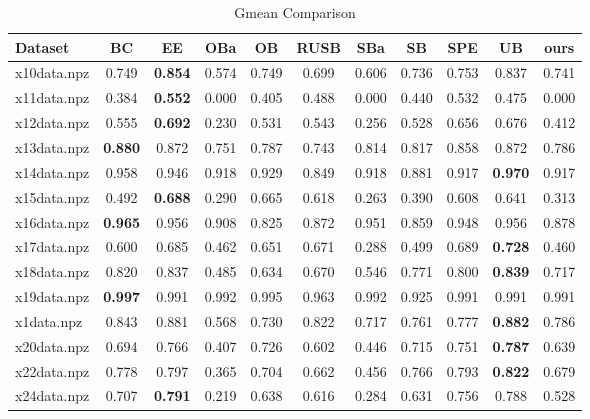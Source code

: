 \documentclass{article}
\begin{document}
\begin{table}[htbp]
\centering
\caption{Gmean Comparison}
\begin{adjustbox}{width=\textwidth}
\label{tab:gmean_comparison}
\begin{tabular}{lcccccccccc}
\hline
\textbf{Dataset} & \textbf{BC} & \textbf{EE} & \textbf{OBa} & \textbf{OB} & \textbf{RUSB} & \textbf{SBa} & \textbf{SB} & \textbf{SPE} & \textbf{UB} & \textbf{ours} \\
\hline
x10data.npz & 0.749 & \cellcolor{graybg}\textbf{0.854} & 0.574 & 0.749 & 0.699 & 0.606 & 0.736 & 0.753 & 0.837 & 0.741 \\
x11data.npz & 0.384 & \cellcolor{graybg}\textbf{0.552} & 0.000 & 0.405 & 0.488 & 0.000 & 0.440 & 0.532 & 0.475 & 0.000 \\
x12data.npz & 0.555 & \cellcolor{graybg}\textbf{0.692} & 0.230 & 0.531 & 0.543 & 0.256 & 0.528 & 0.656 & 0.676 & 0.412 \\
x13data.npz & \cellcolor{graybg}\textbf{0.880} & 0.872 & 0.751 & 0.787 & 0.743 & 0.814 & 0.817 & 0.858 & 0.872 & 0.786 \\
x14data.npz & 0.958 & 0.946 & 0.918 & 0.929 & 0.849 & 0.918 & 0.881 & 0.917 & \cellcolor{graybg}\textbf{0.970} & 0.917 \\
x15data.npz & 0.492 & \cellcolor{graybg}\textbf{0.688} & 0.290 & 0.665 & 0.618 & 0.263 & 0.390 & 0.608 & 0.641 & 0.313 \\
x16data.npz & \cellcolor{graybg}\textbf{0.965} & 0.956 & 0.908 & 0.825 & 0.872 & 0.951 & 0.859 & 0.948 & 0.956 & 0.878 \\
x17data.npz & 0.600 & 0.685 & 0.462 & 0.651 & 0.671 & 0.288 & 0.499 & 0.689 & \cellcolor{graybg}\textbf{0.728} & 0.460 \\
x18data.npz & 0.820 & 0.837 & 0.485 & 0.634 & 0.670 & 0.546 & 0.771 & 0.800 & \cellcolor{graybg}\textbf{0.839} & 0.717 \\
x19data.npz & \cellcolor{graybg}\textbf{0.997} & 0.991 & 0.992 & 0.995 & 0.963 & 0.992 & 0.925 & 0.991 & 0.991 & 0.991 \\
x1data.npz & 0.843 & 0.881 & 0.568 & 0.730 & 0.822 & 0.717 & 0.761 & 0.777 & \cellcolor{graybg}\textbf{0.882} & 0.786 \\
x20data.npz & 0.694 & 0.766 & 0.407 & 0.726 & 0.602 & 0.446 & 0.715 & 0.751 & \cellcolor{graybg}\textbf{0.787} & 0.639 \\
x22data.npz & 0.778 & 0.797 & 0.365 & 0.704 & 0.662 & 0.456 & 0.766 & 0.793 & \cellcolor{graybg}\textbf{0.822} & 0.679 \\
x24data.npz & 0.707 & \cellcolor{graybg}\textbf{0.791} & 0.219 & 0.638 & 0.616 & 0.284 & 0.631 & 0.756 & 0.788 & 0.528 \\

\end{tabular}
\end{adjustbox}
\end{table}
\end{document}
